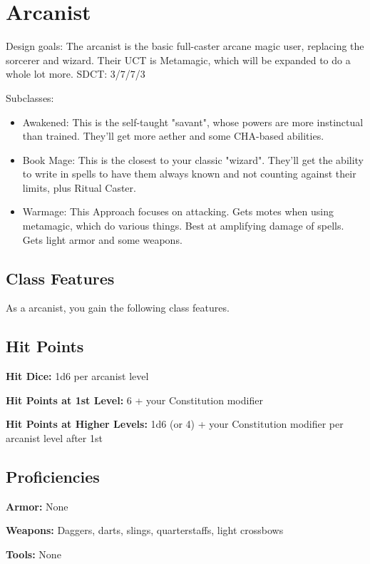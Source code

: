 \section{Arcanist}

Design goals: The arcanist is the basic full-caster arcane magic user, replacing the sorcerer and wizard. Their UCT is Metamagic, which will be expanded to do a whole lot more. SDCT: 3/7/7/3

Subclasses:
\begin{itemize}
	\item Awakened: This is the self-taught "savant", whose powers are more instinctual than trained. They'll get more aether and some CHA-based abilities.
	\item Book Mage: This is the closest to your classic "wizard". They'll get the ability to write in spells to have them always known and not counting against their limits, plus Ritual Caster.
	\item Warmage: This Approach focuses on attacking. Gets motes when using metamagic, which do various things. Best at amplifying damage of spells. Gets light armor and some weapons.
\end{itemize}

\subsection{Class Features}

As a arcanist, you gain the following class features.

\subsection{Hit Points}

\textbf{Hit Dice:} 1d6 per arcanist level

\textbf{Hit Points at 1st Level:} 6 + your Constitution modifier

\textbf{Hit Points at Higher Levels:} 1d6 (or 4) + your Constitution modifier per arcanist level after 1st

\subsection{Proficiencies}

\textbf{Armor:} None

\textbf{Weapons:} Daggers, darts, slings, quarterstaffs, light crossbows

\textbf{Tools:} None

